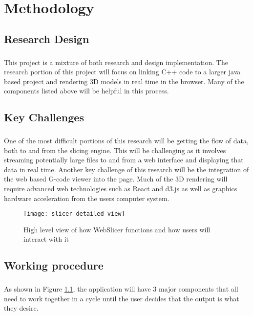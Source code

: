 \chapter{Methodology}

\section{Research Design} 
\paragraph{}
This project is a mixture of both research and design implementation.
The research portion of this project will focus on linking C++ code to a larger java based project and rendering 3D models in real time in the browser.
Many of the components listed above will be helpful in this process.

\section{Key Challenges} 
\paragraph{}
One of the most difficult portions of this research will be getting the flow of data, both to and from the slicing engine.
This will be challenging as it involves streaming potentially large files to and from a web interface and displaying that data in real time.
Another key challenge of this research will be the integration of the web based G-code viewer into the page. 
Much of the 3D rendering will require advanced web technologies such as React and d3.js as well as graphics hardware acceleration from the users computer system.

\begin{figure}[!ht]
  \centering
  \texttt{[image: slicer-detailed-view]}
  \caption{High level view of how WebSlicer functions and how users will interact with it}
  \label{fig:slicer-detailed-view}
\end{figure}

\section{Working procedure}
\paragraph{}
As shown in Figure \ref{fig:slicer-detailed-view}, the application will have 3 major components that all need to work together in a cycle until the user decides that the output is what they desire.


